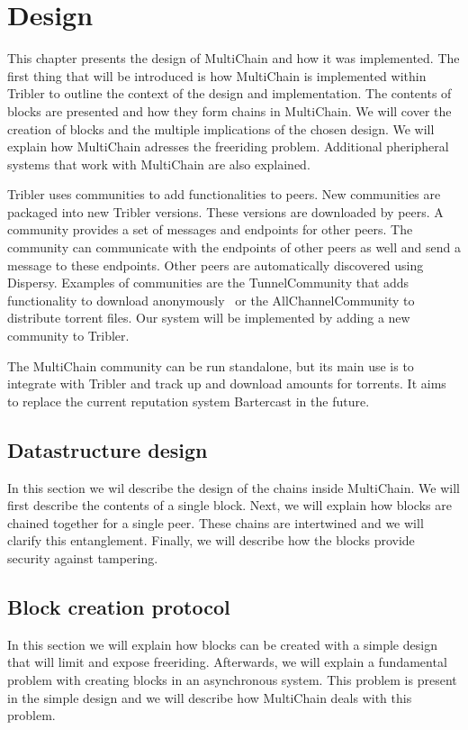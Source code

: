 \chapter{Design}
\label{chapt:design}
This chapter presents the design of MultiChain and how it was implemented.
The first thing that will be introduced is how MultiChain is implemented within Tribler
to outline the context of the design and implementation.
The contents of blocks are presented and how they form chains in MultiChain.
We will cover the creation of blocks and the multiple implications of the chosen design.
We will explain how MultiChain adresses the freeriding problem.
Additional pheripheral systems that work with MultiChain are also explained.

Tribler uses communities to add functionalities to peers.
New communities are packaged into new Tribler versions.
These versions are downloaded by peers.
A community provides a set of messages and endpoints for other peers.
The community can communicate with the endpoints of other peers as well and send a message to these endpoints.
Other peers are automatically discovered using Dispersy.
Examples of communities are the TunnelCommunity that adds functionality to download anonymously~\cite{Plak-anonymous,tanaskoski-anonymous}
or the AllChannelCommunity to distribute torrent files.
Our system will be implemented by adding a new community to Tribler.

The MultiChain community can be run standalone,
but its main use is to integrate with Tribler and track up and download amounts for torrents.
It aims to replace the current reputation system Bartercast in the future.

\section{Datastructure design}
In this section we wil describe the design of the chains inside MultiChain.
We will first describe the contents of a single block.
Next, we will explain how blocks are chained together for a single peer.
These chains are intertwined and we will clarify this entanglement.
Finally, we will describe how the blocks provide security against tampering.






\section{Block creation protocol}
\label{design:block_creation}
In this section we will explain how blocks can be created with a simple design
that will limit and expose freeriding.
Afterwards, we will explain a fundamental problem with creating blocks in an asynchronous system.
This problem is present in the simple design
and we will describe how MultiChain deals with this problem.


